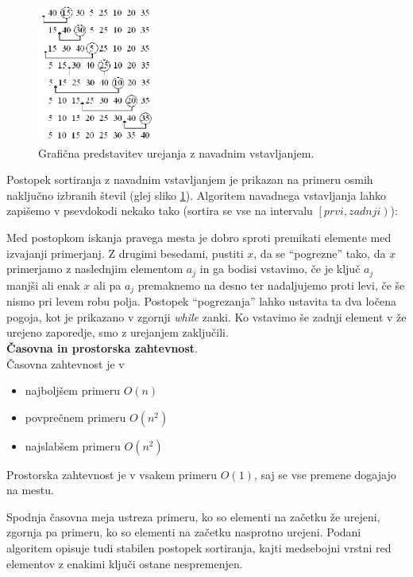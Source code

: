 \documentclass[a4paper,oneside]{article}
\begin{document}
\begin{figure}[h]
    \begin{center}
        \includegraphics[height=45mm]{slike/insertionsort.png}
    \end{center}
    \caption{Grafična predstavitev urejanja z navadnim vstavljanjem.}
    \label{fig:insertion-sort-predst}
\end{figure}

Postopek sortiranja z navadnim vstavljanjem je prikazan na primeru osmih naključno
izbranih števil (glej sliko \ref{fig:insertion-sort-predst}). Algoritem navadnega
vstavljanja lahko zapišemo v psevdokodi nekako tako (sortira se vse na intervalu
$\left[prvi, zadnji\right)$):



Med postopkom iskanja pravega mesta je dobro sproti premikati elemente med izvajanji
primerjanj. Z drugimi besedami, pustiti $x$, da se ``pogrezne'' tako, da $x$
primerjamo z naslednjim elementom $a_j$ in ga bodisi vstavimo, če je ključ $a_j$ manjši
ali enak $x$ ali pa $a_j$ premaknemo na desno ter nadaljujemo proti levi, če še nismo pri
levem robu polja. Postopek ``pogrezanja'' lahko ustavita ta dva ločena
pogoja, kot je prikazano v zgornji \emph{while} zanki.  Ko vstavimo še zadnji element v že 
urejeno zaporedje, smo z urejanjem zaključili.\\

\textbf{Časovna in prostorska zahtevnost}. \\
Časovna zahtevnost je v 
\begin{itemize}
  \item najboljšem primeru $O(n)$
  \item povprečnem primeru $O(n^2)$
  \item najslabšem primeru $O(n^2)$
\end{itemize}

Prostorska zahtevnost je v vsakem primeru $O(1)$, saj se vse premene dogajajo na
mestu.\newline

Spodnja časovna meja ustreza primeru, ko so elementi na začetku že urejeni, zgornja pa primeru,
ko so elementi na začetku nasprotno urejeni. Podani algoritem opisuje tudi stabilen postopek sortiranja, kajti medsebojni
vrstni red elementov z enakimi ključi ostane nespremenjen.
\end{document}
